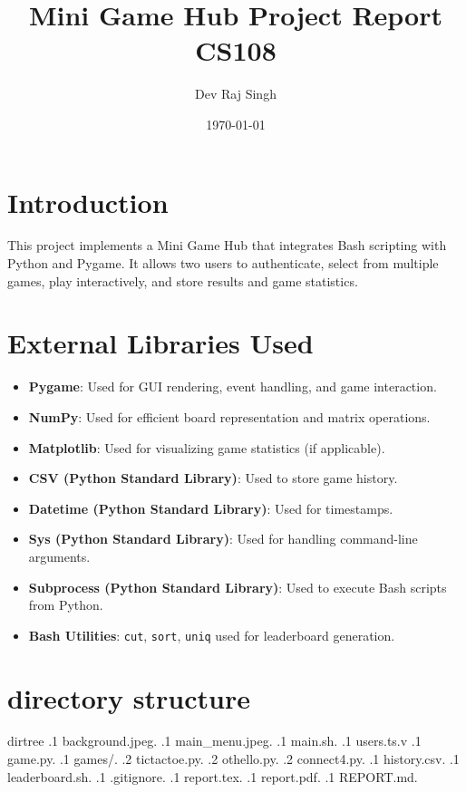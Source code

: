 \documentclass[12pt]{article}
\title{\textbf{Mini Game Hub Project Report}\\CS108}
\author{Dev Raj Singh}
\date{\today}
\begin{document}
\maketitle

\tableofcontents
\newpage

\section{Introduction}

This project implements a Mini Game Hub that integrates Bash scripting with Python and Pygame. It allows two users to authenticate, select from multiple games, play interactively, and store results and game statistics.

\section{External Libraries Used}

\begin{itemize}
    \item \textbf{Pygame}: Used for GUI rendering, event handling, and game interaction.
    \item \textbf{NumPy}: Used for efficient board representation and matrix operations.
    \item \textbf{Matplotlib}: Used for visualizing game statistics (if applicable).
    \item \textbf{CSV (Python Standard Library)}: Used to store game history.
    \item \textbf{Datetime (Python Standard Library)}: Used for timestamps.
    \item \textbf{Sys (Python Standard Library)}: Used for handling command-line arguments.
    \item \textbf{Subprocess (Python Standard Library)}: Used to execute Bash scripts from Python.
    \item \textbf{Bash Utilities}: \texttt{cut}, \texttt{sort}, \texttt{uniq} used for leaderboard generation.
\end{itemize}
\section{directory structure}
dirtree{%
.1 background.jpeg.
.1 main\_menu.jpeg.
.1 main.sh.
.1 users.ts.v
.1 game.py.
.1 games/.
.2 tictactoe.py.
.2 othello.py.
.2 connect4.py.
.1 history.csv.
.1 leaderboard.sh.
.1 .gitignore.
.1 report.tex.
.1 report.pdf.
.1 REPORT.md.
}
\end{document}
